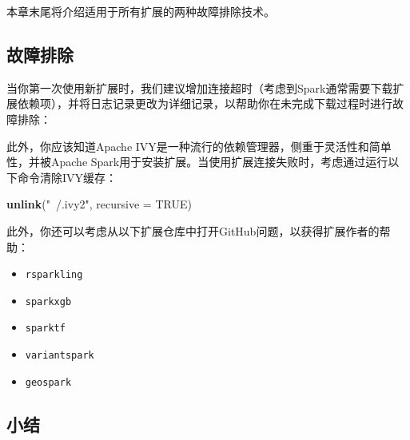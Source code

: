 \documentclass[
]{article}
\newenvironment{Shaded}{\begin{snugshade}}{\end{snugshade}}
\newcommand{\DataTypeTok}[1]{\textcolor[rgb]{0.13,0.29,0.53}{#1}}
\newcommand{\DecValTok}[1]{\textcolor[rgb]{0.00,0.00,0.81}{#1}}
\newcommand{\KeywordTok}[1]{\textcolor[rgb]{0.13,0.29,0.53}{\textbf{#1}}}
\newcommand{\NormalTok}[1]{#1}
\newcommand{\OperatorTok}[1]{\textcolor[rgb]{0.81,0.36,0.00}{\textbf{#1}}}
\newcommand{\OtherTok}[1]{\textcolor[rgb]{0.56,0.35,0.01}{#1}}
\newcommand{\StringTok}[1]{\textcolor[rgb]{0.31,0.60,0.02}{#1}}
\providecommand{\tightlist}{%
  \setlength{\itemsep}{0pt}\setlength{\parskip}{0pt}}
\begin{document}
本章末尾将介绍适用于所有扩展的两种故障排除技术。

\hypertarget{ux6545ux969cux6392ux9664-1}{%
\subsection{故障排除}\label{ux6545ux969cux6392ux9664-1}}

当你第一次使用新扩展时，我们建议增加连接超时（考虑到Spark通常需要下载扩展依赖项），并将日志记录更改为详细记录，以帮助你在未完成下载过程时进行故障排除：

\begin{Shaded}
\end{Shaded}

此外，你应该知道Apache
IVY是一种流行的依赖管理器，侧重于灵活性和简单性，并被Apache
Spark用于安装扩展。当使用扩展连接失败时，考虑通过运行以下命令清除IVY缓存：

\begin{Shaded}
\begin{Highlighting}[]
\KeywordTok{unlink}\NormalTok{(}\StringTok{"~/.ivy2"}\NormalTok{, }\DataTypeTok{recursive =} \OtherTok{TRUE}\NormalTok{)}
\end{Highlighting}
\end{Shaded}

此外，你还可以考虑从以下扩展仓库中打开GitHub问题，以获得扩展作者的帮助：

\begin{itemize}
\tightlist
\item
  \texttt{rsparkling}
\item
  \texttt{sparkxgb}
\item
  \texttt{sparktf}
\item
  \texttt{variantspark}
\item
  \texttt{geospark}
\end{itemize}

\hypertarget{ux5c0fux7ed3-8}{%
\subsection{小结}\label{ux5c0fux7ed3-8}}
\end{document}
